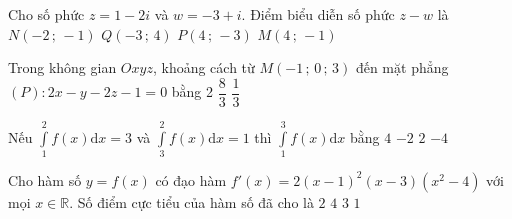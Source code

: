 \begin{ex}%
	Cho số phức $ z=1-2i$ và $w=-3+i$. Điểm biểu diễn số phức $ z-w$ là
	\choice
	{$ N\left(-2\,;\,-1\right)$}
	{$ Q\left(-3\,;\,4\right)$}
	{\True $ P\left(4\,;\,-3\right)$}
	{$ M\left(4\,;\,-1\right)$}
\end{ex}

\begin{ex}%
	Trong không gian $ Oxyz$, khoảng cách từ $ M\left(-1\,;\,0\,;\,3\right)$ đến mặt phẳng $(P)\colon2x-y-2z-1=0$ bằng
	\choice
	{}
	{2}
	{$\dfrac{8}{3}$}
	{$\dfrac{1}{3}$}
\end{ex}

\begin{ex}%
	Nếu $\displaystyle\int\limits_1^2f(x)\text{d}x=3$ và $\displaystyle\int\limits_3^2f(x)\text{d}x=1$ thì $\displaystyle\int\limits_1^3f(x)\text{d}x$ bằng
	\choice
	{$ 4$}
	{$-2$}
	{\True $ 2$}
	{$-4$}
\end{ex}

\begin{ex}%
	Cho hàm số $ y=f(x)$ có đạo hàm $f'(x)=2(x-1)^2(x-3)(x^2-4)$ với mọi $ x\in\mathbb{R}$. Số điểm cực tiểu của hàm số đã cho là
	\choice
	{\True $ 2$}
	{$ 4$}
	{$ 3$}
	{$ 1$}
\end{ex}

